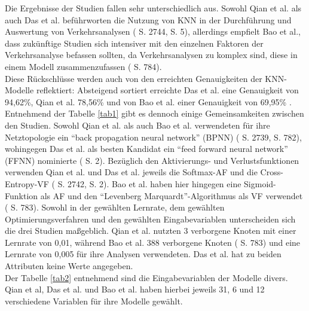 \documentclass{scrartcl}
\begin{document}
Die Ergebnisse der Studien fallen sehr unterschiedlich aus. Sowohl Qian et al.
als auch Das et al. beführworten die Nutzung von KNN in der Durchführung
und Auswertung von Verkehrsanalysen (\cite{qian} S. 2744, \cite{das} S. 5),
allerdings empfielt Bao et al., dass zukünftige Studien sich intensiver mit
den einzelnen Faktoren der Verkehrsanalyse befassen sollten, da Verkehrsanalysen
zu komplex sind, diese in einem Modell zusammenzufassen (\cite{bao} S. 784).
\medskip \\
Diese Rückschlüsse werden auch von den erreichten Genauigkeiten der KNN-Modelle
reflektiert: Absteigend sortiert erreichte Das et al. eine Genauigkeit von 94,62\%, Qian et al. 78,56\%
und von Bao et al. einer Genauigkeit von 69,95\% \cite{das, qian, bao}.
\medskip \\
Entnehmend der Tabelle \ref{tab1} gibt es dennoch einige Gemeinsamkeiten
zwischen den Studien. Sowohl Qian et al. als auch Bao et al. verwendeten für
ihre Netztopologie ein \enquote{back propagation neural network} (BPNN)
(\cite{qian} S. 2739, \cite{bao} S. 782), wohingegen Das et al. als besten Kandidat
ein \enquote{feed forward neural network} (FFNN) nominierte (\cite{das} S. 2).
Bezüglich den Aktivierungs- und Verlustsfunktionen verwenden Qian et al.
und Das et al. jeweils die Softmax-AF und die Cross-Entropy-VF
(\cite{qian} S. 2742, \cite{das} S. 2).
Bao et al. haben hier hingegen eine Sigmoid-Funktion als AF und den
\enquote{Levenberg Marquardt}-Algorithmus als VF verwendet (\cite{bao} S. 783).
Sowohl in der gewählten Lernrate, dem gewählten Optimierungsverfahren und den
gewählten Eingabevariablen unterscheiden sich die drei Studien maßgeblich.
Qian et al. nutzten 3 verborgene Knoten mit einer Lernrate von 0,01, während
Bao et al. 388 verborgene Knoten (\cite{bao} S. 783) und eine Lernrate von 0,005 
für ihre Analysen verwendeten. 
Das et al. hat zu beiden Attributen keine Werte angegeben.
\medskip \\
Der Tabelle \ref{tab2} entnehmend sind die Eingabevariablen der Modelle divers.
Qian et al, Das et al. und Bao et al. haben hierbei jeweils 31, 6 und 12 
verschiedene Variablen für ihre Modelle gewählt.
\end{document}
